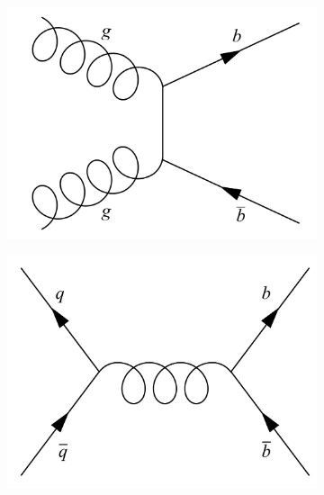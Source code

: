 \begin{figure}[tbp]
  \centering
  \begin{subfigure}[b]{0.4\textwidth}
    \includegraphics[width=\textwidth]{./Figs/LHC_LHCb/bbbar_prod_1.pdf}
    \caption{}
    \label{fig:}   
  \end{subfigure}             
  \begin{subfigure}[b]{0.4\textwidth}
    \includegraphics[width=\textwidth]{./Figs/LHC_LHCb/bbbar_prod_2.pdf}
    \caption{}
    \label{fig:}
  \end{subfigure}             
  \begin{subfigure}[b]{0.4\textwidth}

\end{subfigure}
\end{figure}
